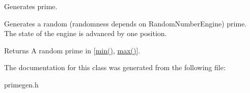 Generates prime. 

Generates a random (randomness depends on {\ttfamily Random\+Number\+Engine}) prime. The state of the engine is advanced by one position.

\begin{DoxyReturn}{Returns}
A random prime in \mbox{[}\hyperlink{class_prime_gen_1_1_generators_1_1random__prime__engine_aca7cba717ac90823ba325c6e4d79d1a2}{min()}, \hyperlink{class_prime_gen_1_1_generators_1_1random__prime__engine_a123bf5e419910ff9b04916408fbdd228}{max()}\mbox{]}. 
\end{DoxyReturn}


The documentation for this class was generated from the following file\+:\begin{DoxyCompactItemize}
\item 
primegen.\+h\end{DoxyCompactItemize}
